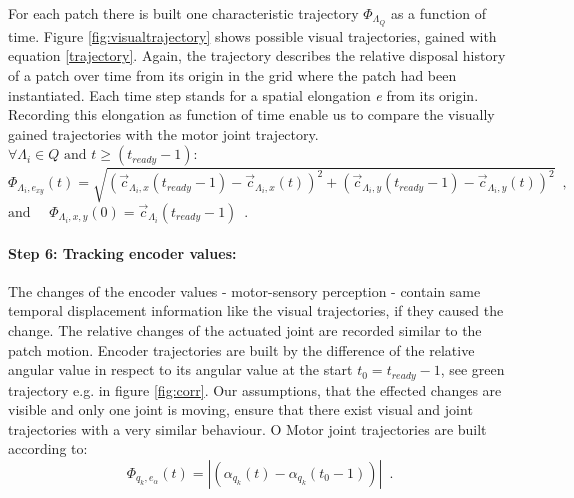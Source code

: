 For each patch there is built one characteristic trajectory $ \Phi_{\Lambda_Q} $ as a function of time. Figure \ref{fig:visualtrajectory} shows possible visual trajectories, gained with equation \ref{trajectory}. Again, the trajectory describes the relative disposal history of a patch over time from its origin in the grid where the patch had been instantiated. Each time step stands for a spatial elongation \textit{e} from its origin. Recording this elongation as function of time enable us to compare the visually gained trajectories with the motor joint trajectory. 
%
$\forall \Lambda_i \in Q \mbox{ and } t \geq \left( t_{ready} -1\right) :   $
\begin{equation}
\label{trajectory}
	\Phi_{\Lambda_{i}, e_{xy}} \left( t \right) = \sqrt { \left( { \vec{c}_{ \Lambda_{i} , x } \left( t_{ready} -1 \right) - \vec{c}_{\Lambda_{i} , x} \left( t \right)} \right)^2 +  \left( \vec{c}_{\Lambda_{i} , y} \left( t_{ready} -1 \right) - \vec{c}_{\Lambda_{i} , y}\left( t \right) \right)^2} \enspace ,
\end{equation} 
$\mbox{and } \quad \Phi_{\Lambda_i , x,y} \left( 0 \right) = \vec{c}_{\Lambda_i} \left( t_{ready} -1 \right) \enspace .$
%
%
%
%
\paragraph{Step 6: Tracking encoder values:}
\label{halose:halo:algorithm:step8enc}
%
The changes of the encoder values - motor-sensory perception - contain same temporal displacement information like the visual trajectories, if they caused the change. The relative changes of the actuated joint are recorded similar to the patch motion.  Encoder trajectories are built by the difference of the relative angular value in respect to its angular value at the start $t_0 = t_{ready}-1$, see green trajectory e.g. in figure \ref{fig:corr}. Our assumptions, that the effected changes are visible and only one joint is moving, ensure that there exist visual and joint trajectories with a very similar behaviour. O%
Motor joint trajectories are built according to: 
\begin{equation}
\label{jointtrajectory}
	\Phi_{q_{k}, e_{\alpha}} \left(t\right) = \left| \left( \alpha_{q_{k}} \left(t\right) - \alpha_{q_{k}} \left(t_0-1\right)\right) \right| \enspace .
\end{equation} 
%
%

